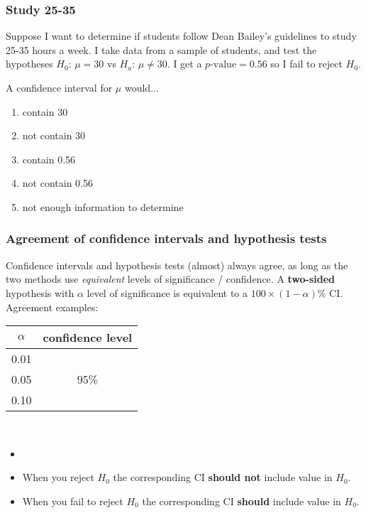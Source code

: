 \begin{frame}
\frametitle{Study 25-35}
Suppose I want to determine if students follow Dean Bailey's guidelines to study 25-35 hours a week.  I take data from a sample of students, and test the hypotheses $H_0$: $\mu=30$ vs  $H_a$: $\mu \neq 30$.  I get a $p\mbox{-value}=0.56$ so I fail to reject $H_0$.
\begin{clicker}{A confidence interval for $\mu$ would...}
\begin{enumerate}
    \item
    contain 30
    \item
    not contain 30
    \item
    contain 0.56
    \item
    not contain 0.56
    \item
    not enough information to determine
\end{enumerate}
\end{clicker}
\end{frame}

\begin{frame}
\frametitle{Agreement of confidence intervals and hypothesis tests}
Confidence intervals and hypothesis tests (almost) always agree, as long as the two methods use \emph{equivalent} levels of significance / confidence.   A \textbf{two-sided} hypothesis with $\alpha$ level of significance is equivalent to a $100\times(1-\alpha)\%$ CI.  Agreement examples: \\%
\vskip10pt
\begin{tabular}{cc}
\hline 
$\alpha$ & confidence level \\
\hline 
0.01 & \\
0.05 & 95\% \\
0.10 & \\
\hline 
\end{tabular}
\\
\begin{itemize}
        \item[]
        \item
        When you reject $H_0$ the corresponding CI \textbf{should not} include value in $H_0$.
        \item
        When you fail to reject $H_0$ the corresponding CI \textbf{should} include value in $H_0$.
\end{itemize}
\end{frame}

